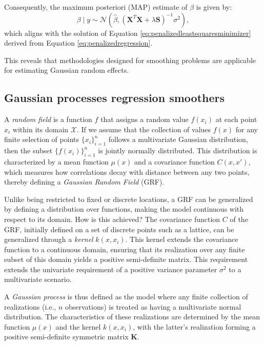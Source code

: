 \documentclass[
11pt, %
oneside, %
english, %
singlespacing, %
]{macthesis} %
\begin{document}
Consequently, the maximum posteriori (MAP) estimate of \(\beta\) is given by:
\begin{equation}
\beta \mid y \sim \mathcal{N}(\hat{\beta}, (\mathbf{X}^T \mathbf{X} + \lambda \mathbf{S})^{-1} \sigma^2),
\label{eq:MAP estimate}
\end{equation}
which aligns with the solution of Equation \ref{eq:penalizedleastsquaresminimizer} derived from Equation \ref{eq:penalizedregression}.

This reveals that methodologies designed for smoothing problems are applicable for estimating Gaussian random effects.

\subsection{Gaussian processes regression smoothers}\label{Gaussian-process-regression-smoothers}

A \emph{random field} is a function \(f\) that assigns a random value \(f(x_i)\) at each point \(x_i\) within its domain \(\mathcal{X}\). If we assume that the collection of values \(f(x)\) for any finite selection of points \(\{x_i\}_{i=1}^n\) follows a multivariate Gaussian distribution, then the subset \(\{f(x_i)\}_{i=1}^n\) is jointly normally distributed. This distribution is characterized by a mean function \(\mu(x)\) and a covariance function \(C(x, x')\), which measures how correlations decay with distance between any two points, thereby defining a \emph{Gaussian Random Field} (GRF).

Unlike being restricted to fixed or discrete locations, a GRF can be generalized by defining a distribution over functions, making the model continuous with respect to its domain. How is this achieved? The covariance function \(C\) of the GRF, initially defined on a set of discrete points such as a lattice, can be generalized through a \emph{kernel} \(k(x, x_i)\). This kernel extends the covariance function to a continuous domain, ensuring that its realization over any finite subset of this domain yields a positive semi-definite matrix. This requirement extends the univariate requirement of a positive variance parameter \(\sigma^2\) to a multivariate scenario.

A \emph{Gaussian process} is thus defined as the model where any finite collection of realizations (i.e., \(n\) observations) is treated as having a multivariate normal distribution. The characteristics of these realizations are determined by the mean function \(\mu(x)\) and the kernel \(k(x, x_i)\), with the latter's realization forming a positive semi-definite symmetric matrix \(\mathbf{K}\).
\end{document}
